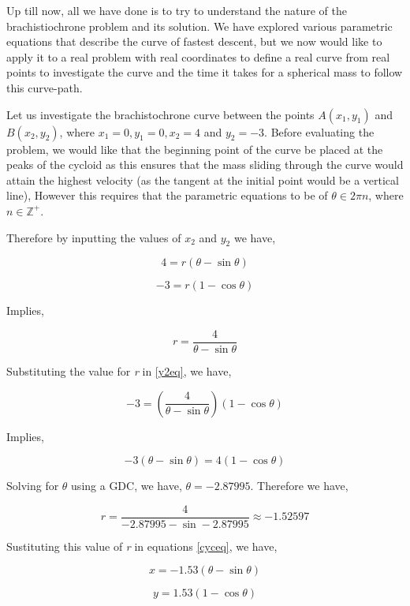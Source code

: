 

{Up till now, all we have done is to try to understand the nature of the brachistiochrone problem and its solution. We have explored various parametric equations that describe the curve of fastest descent, but we now would like to apply it to a real problem with real coordinates to define a real curve from real points to investigate the curve and the time it takes for a spherical mass to follow this curve-path.}

{Let us investigate the brachistochrone curve between the points $A(x_{1},y_{1})$ and $B(x_{2},y_{2})$, where $x_{1} = 0, y_{1} = 0, x_{2} = 4$ and $y_{2} = -3$. Before evaluating the problem, we would like that the beginning point of the curve be placed at the peaks of the cycloid as this ensures that the mass sliding through the curve would attain the highest velocity (as the tangent at the initial point would be a vertical line), However this requires that the parametric equations to be of $\theta\in2\pi n$, where $n\in\mathbb{Z}^{+}$.}

{Therefore by inputting the values of $x_{2}$ and $y_{2}$ we have,}

	\begin{equation}
		4 = r\left(\theta - \sin\theta\right)
		\label{x2eq}
	\end{equation}

	\begin{equation}
		-3 = r\left(1 - \cos\theta\right)
		\label{y2eq}
	\end{equation}

{Implies,}

	$$r = \frac{4}{\theta - \sin\theta}$$

{Substituting the value for \textit{r} in \ref{y2eq}, we have,}

	$$-3 = \left(\frac{4}{\theta - \sin\theta}\right)\left(1 - \cos\theta\right)$$

{Implies,}

	$$-3\left(\theta - \sin\theta\right) = 4\left(1 - \cos\theta\right)$$

{Solving for $\theta$ using a GDC, we have, $\theta = -2.87995$. Therefore we have,}

	$$r = \frac{4}{-2.87995 - \sin -2.87995} \approx -1.52597$$

{Sustituting this value of \textit{r} in equations \ref{cyceq}, we have,}

	$$x = -1.53\left(\theta - \sin\theta\right)$$

	$$y = 1.53\left(1 - \cos\theta\right)$$


